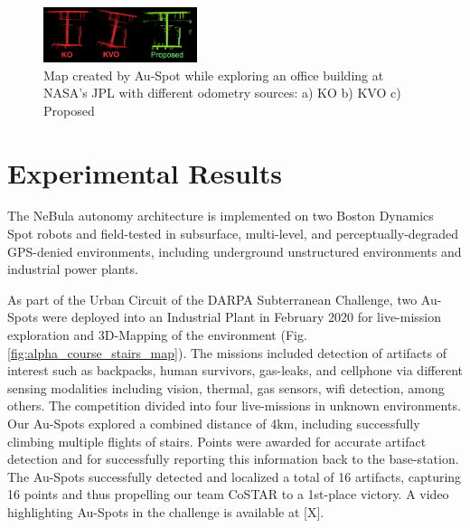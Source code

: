 \documentclass[letterpaper, 10pt, conference]{ieeeconf}      %
\newcommand{\todo}[1]{{\color{red} #1 }} %
\newcommand{\inst}[1]{{\color{orange} #1 }} %
\newcommand{\rev}[1]{{\color{blue}#1}} %
\begin{document}
\begin{figure}[t!]
  \centering
  \includegraphics[width=0.4\textwidth]{spot_iros/graphics/spot_proposed_office.PNG}
  \caption{\rev{Map created by Au-Spot while exploring an office building at NASA's JPL with different odometry sources: a) KO b) KVO c) Proposed}}
  \label{spot_indoor_office}
\end{figure}

\section{Experimental Results}\label{sec:experiments}

The NeBula autonomy architecture is implemented on two Boston Dynamics Spot robots and  field-tested in subsurface, multi-level, and perceptually-degraded GPS-denied environments, including underground unstructured environments and industrial power plants.

As part of the Urban Circuit of the DARPA Subterranean Challenge, two Au-Spots were deployed into an Industrial Plant in February 2020 for live-mission exploration and  3D-Mapping of the environment (Fig. \ref{fig:alpha_course_stairs_map}).  The missions included detection of artifacts of interest such as backpacks, human survivors, gas-leaks, and cellphone via different sensing modalities including vision, thermal, gas sensors, wifi detection, among others. The competition divided into four live-missions in unknown environments. %
Our Au-Spots explored a combined distance of 4km, including successfully climbing multiple flights of stairs. Points were awarded for accurate artifact detection and for successfully reporting this information back to the base-station.   
The Au-Spots successfully detected and localized a total of 16 artifacts, capturing 16 points \rev{and thus propelling our team CoSTAR to a 1st-place victory. }
\todo{A video highlighting Au-Spots in the challenge is available at [X].}
\end{document}
